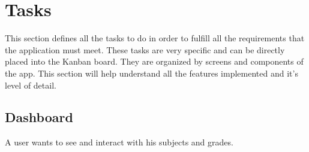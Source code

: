 \clearpage\newpage
\section{Tasks}

This section defines all the tasks to do in order to fulfill all the requirements that the application must meet. These tasks are very specific and can be directly placed into the Kanban board. They are organized by screens and components of the app. This section will help understand all the features implemented and it's level of detail.



\subsection*{Dashboard}
A user wants to see and interact with his subjects and grades.

